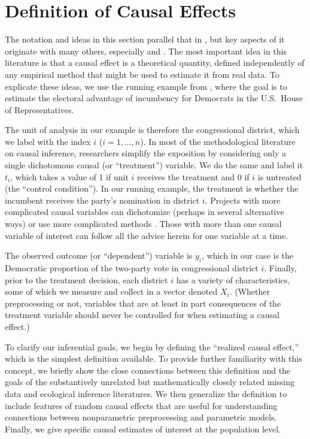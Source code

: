 \documentclass[11pt,titlepage]{article}
\begin{document}
\section{Definition of Causal Effects}

The notation and ideas in this section parallel that in
\citet[][Section 3.1.1]{KinKeoVer94}, but key aspects of it originate
with many others, especially \citet{Rubin74} and \citet{Holland86}.
The most important idea in this literature is that a causal effect is
a theoretical quantity, defined independently of any empirical method
that might be used to estimate it from real data.  To explicate these
ideas, we use the running example from \citet[][Section
3.1.1]{KinKeoVer94}, where the goal is to estimate the electoral
advantage of incumbency for Democrats in the U.S.\ House of
Representatives.

The unit of analysis in our example is therefore the congressional
district, which we label with the index $i$ ($i=1,\dots,n$).  In most
of the methodological literature on causal inference, researchers
simplify the exposition by considering only a single dichotomous
causal (or ``treatment'') variable.  We do the same and label it
$t_i$, which takes a value of 1 if unit $i$ receives the treatment and
0 if $i$ is untreated (the ``control condition'').  In our running
example, the treatment is whether the incumbent receives the party's
nomination in district $i$.  Projects with more complicated causal
variables can dichotomize (perhaps in several alternative ways) or use
more complicated methods \citep{ImaDyk03}.  Those with more than one
causal variable of interest can follow all the advice herein for one
variable at a time.

The observed outcome (or ``dependent'') variable is $y_i$, which in
our case is the Democratic proportion of the two-party vote in
congressional district $i$.  Finally, prior to the treatment decision,
each district $i$ has a variety of characteristics, some of which we
measure and collect in a vector denoted $X_i$.  (Whether preprocessing
or not, variables that are at least in part consequences of the
treatment variable should never be controlled for when estimating a
causal effect.)

To clarify our inferential goals, we begin by defining the ``realized
causal effect,'' which is the simplest definition available.  To
provide further familiarity with this concept, we briefly show the
close connections between this definition and the goals of the
substantively unrelated but mathematically closely related missing
data and ecological inference literatures.  We then generalize the
definition to include features of random causal effects that are
useful for understanding connections between nonparametric
preprocessing and parametric models.  Finally, we give specific causal
estimates of interest at the population level.
\end{document}
